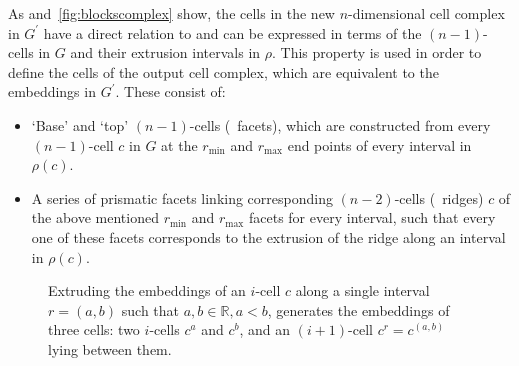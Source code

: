 As  and~\ref{fig:blockscomplex} show, the cells in the new $n$-dimensional cell complex in $G^\prime$ have a direct relation to and can be expressed in terms of the $(n-1)$-cells in $G$ and their extrusion intervals in $\rho$.
This property is used in order to define the cells of the output cell complex, which are equivalent to the embeddings in $G^\prime$.
These consist of:
\begin{itemize}
\item
`Base' and `top' $(n-1)$-cells (\ie\ facets), which are constructed from every $(n-1)$-cell $c$ in $G$ at the $r_{\min}$ and $r_{\max}$ end points of every interval in $\rho(c)$.
\item
A series of prismatic facets linking corresponding $(n-2)$-cells (\ie\ ridges) $c$ of the above mentioned $r_{\min}$ and $r_{\max}$ facets for every interval, such that every one of these facets corresponds to the extrusion of the ridge along an interval in $\rho(c)$. 
\end{itemize}

\begin{figure}[tb]
\centering
{}
\quad
{}
\caption[Extruding the embeddings]{Extruding the embeddings of an $i$-cell $c$ along a single interval $r = (a,b)$ such that $a,b \in \mathbb{R}, a < b$, generates the embeddings of three cells: two $i$-cells $c^{a}$ and $c^{b}$, and an $(i+1)$-cell $c^{r} = c^{(a,b)}$ lying between them.}
\label{fig:trianglecomplex}
\end{figure}

